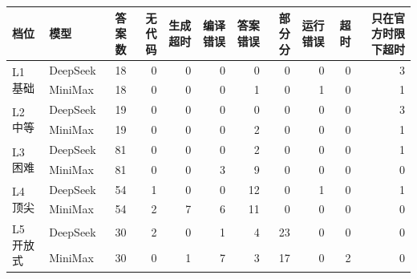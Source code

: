 \begin{tabular}{ll*{9}{r}}
\toprule
档位 & 模型 & 答案数 & 无代码 & 生成超时 & 编译错误 & 答案错误 & 部分分 & 运行错误 & 超时 & 只在官方时限下超时 \\
\midrule
\multirow{2}{*}{L1 基础} & DeepSeek & 18 & 0 & 0 & 0 & 0 & 0 & 0 & 0 & 3 \\
 & MiniMax & 18 & 0 & 0 & 0 & 1 & 0 & 1 & 0 & 1 \\
\midrule
\multirow{2}{*}{L2 中等} & DeepSeek & 19 & 0 & 0 & 0 & 0 & 0 & 0 & 0 & 3 \\
 & MiniMax & 19 & 0 & 0 & 0 & 2 & 0 & 0 & 0 & 1 \\
\midrule
\multirow{2}{*}{L3 困难} & DeepSeek & 81 & 0 & 0 & 0 & 2 & 0 & 0 & 0 & 1 \\
 & MiniMax & 81 & 0 & 0 & 3 & 9 & 0 & 0 & 0 & 0 \\
\midrule
\multirow{2}{*}{L4 顶尖} & DeepSeek & 54 & 1 & 0 & 0 & 12 & 0 & 1 & 0 & 1 \\
 & MiniMax & 54 & 2 & 7 & 6 & 11 & 0 & 0 & 0 & 0 \\
\midrule
\multirow{2}{*}{L5 开放式} & DeepSeek & 30 & 2 & 0 & 1 & 4 & 23 & 0 & 0 & 0 \\
 & MiniMax & 30 & 0 & 1 & 7 & 3 & 17 & 0 & 2 & 0 \\
\bottomrule
\end{tabular}
